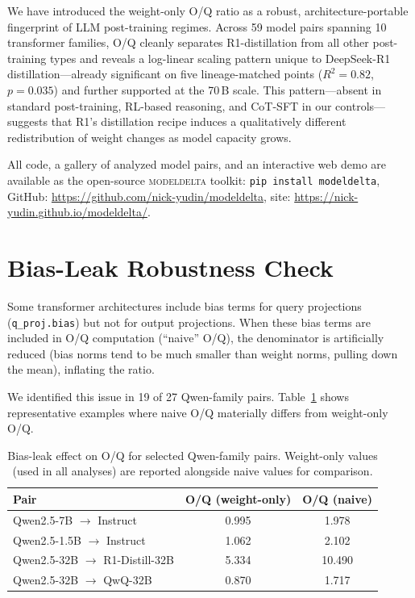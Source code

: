 \documentclass[11pt]{article}
\newcommand{\modeldelta}{\textsc{modeldelta}}
\begin{document}
We have introduced the weight-only O/Q ratio as a robust,
architecture-portable fingerprint of LLM post-training regimes.
Across 59 model pairs spanning 10 transformer families, O/Q cleanly separates
R1-distillation from all other post-training types and reveals a log-linear
scaling pattern unique to
DeepSeek-R1 distillation---already significant on five lineage-matched points
($R^2 = 0.82$, $p = 0.035$) and further supported at the 70\,B scale.
This pattern---absent in standard post-training, RL-based reasoning,
and CoT-SFT in our controls---suggests that R1's distillation recipe induces a
qualitatively different redistribution of weight changes as model capacity grows.

All code, a gallery of analyzed model pairs, and an interactive web demo
are available as the open-source \modeldelta{} toolkit:
\texttt{pip install modeldelta},
GitHub: \url{https://github.com/nick-yudin/modeldelta},
site: \url{https://nick-yudin.github.io/modeldelta/}.






\appendix

\section{Bias-Leak Robustness Check}
\label{app:bias}

Some transformer architectures include bias terms for query projections
(\texttt{q\_proj.bias}) but not for output projections.
When these bias terms are included in O/Q computation (``naive'' O/Q), the
denominator is artificially reduced (bias norms tend to be much smaller than
weight norms, pulling down the mean), inflating the ratio.

We identified this issue in 19 of 27 Qwen-family pairs.
Table~\ref{tab:bias} shows representative examples where naive O/Q materially
differs from weight-only O/Q.

\begin{table}[h]
\centering
\caption{Bias-leak effect on O/Q for selected Qwen-family pairs.
Weight-only values (used in all analyses) are reported alongside
naive values for comparison.}
\label{tab:bias}
\begin{tabular}{lcc}
\toprule
Pair & O/Q (weight-only) & O/Q (naive) \\
\midrule
Qwen2.5-7B $\to$ Instruct & 0.995 & 1.978 \\
Qwen2.5-1.5B $\to$ Instruct & 1.062 & 2.102 \\
Qwen2.5-32B $\to$ R1-Distill-32B & 5.334 & 10.490 \\
Qwen2.5-32B $\to$ QwQ-32B & 0.870 & 1.717 \\
\bottomrule
\end{tabular}
\end{table}
\end{document}
